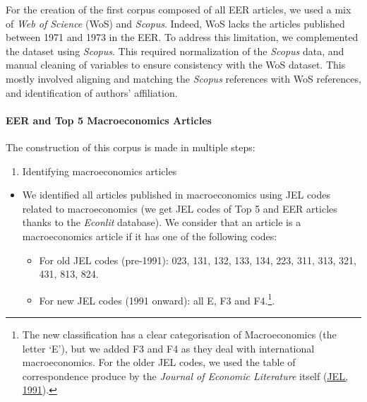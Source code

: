 \documentclass[
  12pt,
  onecolumn]{article}
\providecommand{\tightlist}{%
  \setlength{\itemsep}{0pt}\setlength{\parskip}{0pt}}
\begin{document}
For the creation of the first corpus composed of all EER articles, we used a mix of \emph{Web of Science} (WoS) and \emph{Scopus}. Indeed, WoS lacks the articles published between 1971 and 1973 in the EER. To address this limitation, we complemented the dataset using \emph{Scopus}. This required normalization of the \emph{Scopus} data, and manual cleaning of variables to ensure consistency with the WoS dataset. This mostly involved aligning and matching the \emph{Scopus} references with WoS references, and identification of authors' affiliation.

\hypertarget{eer-top5-macro}{%
\paragraph*{EER and Top 5 Macroeconomics Articles}\label{eer-top5-macro}}

The construction of this corpus is made in multiple steps:

\begin{enumerate}
\def\labelenumi{\arabic{enumi}.}
\tightlist
\item
  Identifying macroeconomics articles
\end{enumerate}

\begin{itemize}
\tightlist
\item
  We identified all articles published in macroeconomics using JEL codes related to macroeconomics (we get JEL codes of Top 5 and EER articles thanks to the \emph{Econlit} database). We consider that an article is a macroeconomics article if it has one of the following codes:

  \begin{itemize}
  \tightlist
  \item
    For old JEL codes (pre-1991): 023, 131, 132, 133, 134, 223, 311, 313, 321, 431, 813, 824.
  \item
    For new JEL codes (1991 onward): all E, F3 and F4.\footnote{The new classification has a clear categorisation of Macroeconomics (the letter `E'), but we added F3 and F4 as they deal with international macroeconomics. For the older JEL codes, we used the table of correspondence produce by the \emph{Journal of Economic Literature} itself (\protect\hyperlink{ref-jel1991}{JEL, 1991}).}.
  \end{itemize}
\end{itemize}
\end{document}

